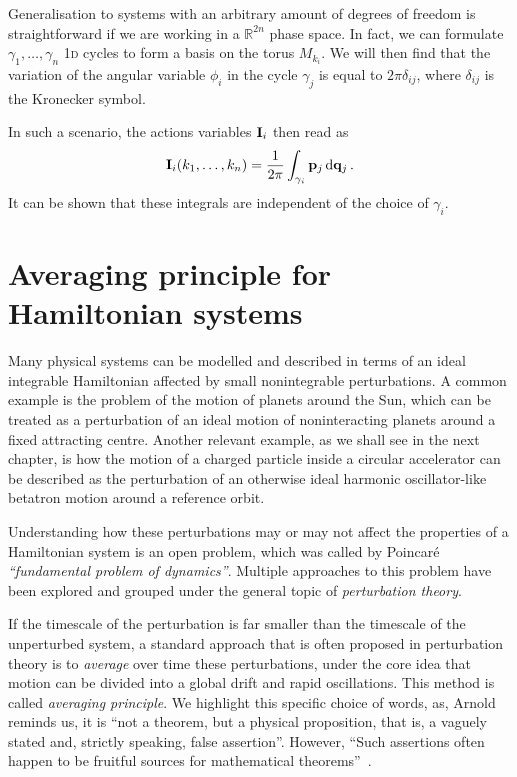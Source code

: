 Generalisation to systems with an arbitrary amount of degrees of freedom is straightforward if we are working in a $\mathbb{R}^{2n}$ phase space. In fact, we can formulate $\gamma_1,\dots, \gamma_n$ 1\textsc{d} cycles to form a basis on the torus $M_{k_i}$. We will then find that the variation of the angular variable $\phi_i$ in the cycle $\gamma_j$ is equal to $2\pi\delta_{ij}$, where $\delta_{ij}$ is the Kronecker symbol.

In such a scenario, the actions variables $\vb{I}_i$ then read as
%
\begin{equation}
    \vb{I}_i(k_1,\dots,k_n) = \frac{1}{2\pi}\int_{\gamma_i} \vb{p}_j\, \dd \vb{q}_j\, .  
\end{equation} 
%
It can be shown that these integrals are independent of the choice of $\gamma_i$.~\cite{Arnold:937549}

\section{Averaging principle for Hamiltonian systems}\label{sec:1:averaging}

Many physical systems can be modelled and described in terms of an ideal integrable Hamiltonian affected by small nonintegrable perturbations. A common example is the problem of the motion of planets around the Sun, which can be treated as a perturbation of an ideal motion of noninteracting planets around a fixed attracting centre. Another relevant example, as we shall see in the next chapter, is how the motion of a charged particle inside a circular accelerator can be described as the perturbation of an otherwise ideal harmonic oscillator-like betatron motion around a reference orbit.

Understanding how these perturbations may or may not affect the properties of a Hamiltonian system is an open problem, which was called by Poincaré \textit{``fundamental problem of dynamics''}. Multiple approaches to this problem have been explored and grouped under the general topic of \textit{perturbation theory}.

If the timescale of the perturbation is far smaller than the timescale of the unperturbed system, a standard approach that is often proposed in perturbation theory is to \textit{average} over time these perturbations, under the core idea that motion can be divided into a global drift and rapid oscillations. This method is called \textit{averaging principle}. We highlight this specific choice of words, as, Arnold reminds us, it is ``not a theorem, but a physical proposition, that is, a vaguely stated and, strictly speaking, false assertion''. However, ``Such assertions often happen to be fruitful sources for mathematical theorems''~\cite{Arnold:937549}.

